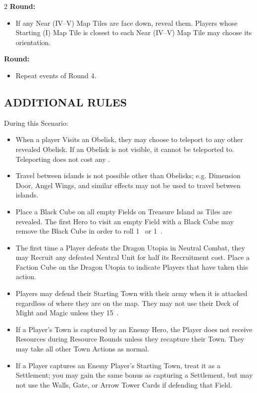\begin{multicols*}{2}
\textbf{ Round:}
\begin{itemize}
  \item If any Near (IV--V) Map Tiles are face down, reveal them. Players whose Starting (I) Map Tile is closest to each Near (IV--V) Map Tile may choose its orientation.
\end{itemize}

\textbf{ Round:}
\begin{itemize}
  \item Repeat events of Round 4.
\end{itemize}

\subsection*{\MakeUppercase{Additional Rules}}

During this Scenario:

\begin{itemize}
  \item When a player Visits an Obelisk, they may choose to teleport to any other revealed Obelisk. If an Obelisk is not visible, it cannot be teleported to. Teleporting does not cost any .
  \item Travel between islands is not possible other than Obelisks; e.g. Dimension Door, Angel Wings, and similar effects may not be used to travel between islands.
  \item Place a Black Cube on all empty Fields on Treasure Island as Tiles are revealed. The first Hero to visit an empty Field with a Black Cube may remove the Black Cube in order to roll 1~ or 1~.
  \item The first time a Player defeats the Dragon Utopia in Neutral Combat, they may Recruit any defeated Neutral Unit for half its Recruitment cost. Place a Faction Cube on the Dragon Utopia to indicate Players that have taken this action.
  \item Players may defend their Starting Town with their army when it is attacked regardless of where they are on the map. They may not use their Deck of Might and Magic unless they  15~.
  \item If a Player's Town is captured by an Enemy Hero, the Player does not receive Resources during Resource Rounds unless they recapture their Town. They may take all other Town Actions as normal.
  \item If a Player captures an Enemy Player's Starting Town, treat it as a Settlement; you may gain the same bonus as capturing a Settlement, but may not use the Walls, Gate, or Arrow Tower Cards if defending that Field.
\end{itemize}

\vspace*{\fill}


\end{multicols*}


